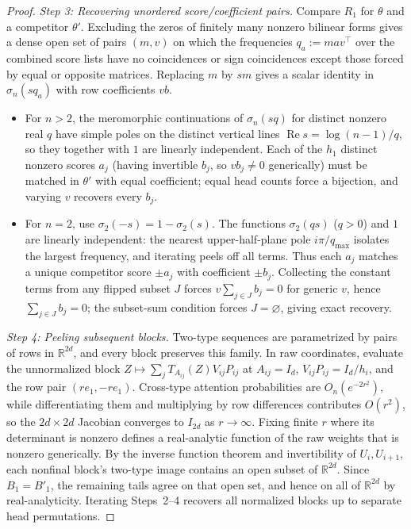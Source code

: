 \documentclass[11pt]{article}
\theoremstyle{plain}
\theoremstyle{definition}
\theoremstyle{remark}
\begin{document}
\begin{proof}
\emph{Step 3: Recovering unordered score/coefficient pairs.}
Compare $R_1$ for $\theta$ and a competitor $\theta'$. Excluding the zeros of finitely many nonzero bilinear forms gives a dense open set of pairs $(m, v)$ on which the frequencies $q_a := m a v^\top$ over the combined score lists have no coincidences or sign coincidences except those forced by equal or opposite matrices. Replacing $m$ by $sm$ gives a scalar identity in $\sigma_n(s q_a)$ with row coefficients $v b$.
\begin{itemize}[leftmargin=2em,itemsep=2pt]
\item For $n > 2$, the meromorphic continuations of $\sigma_n(sq)$ for distinct nonzero real $q$ have simple poles on the distinct vertical lines $\operatorname{Re} s = \log(n - 1)/q$, so they together with $1$ are linearly independent. Each of the $h_1$ distinct nonzero scores $a_j$ (having invertible $b_j$, so $v b_j \neq 0$ generically) must be matched in $\theta'$ with equal coefficient; equal head counts force a bijection, and varying $v$ recovers every $b_j$.
\item For $n = 2$, use $\sigma_2(-s) = 1 - \sigma_2(s)$. The functions $\sigma_2(qs)$ ($q > 0$) and $1$ are linearly independent: the nearest upper-half-plane pole $i\pi / q_{\max}$ isolates the largest frequency, and iterating peels off all terms. Thus each $a_j$ matches a unique competitor score $\pm a_j$ with coefficient $\pm b_j$. Collecting the constant terms from any flipped subset $J$ forces $v \sum_{j \in J} b_j = 0$ for generic $v$, hence $\sum_{j \in J} b_j = 0$; the subset-sum condition forces $J = \varnothing$, giving exact recovery.
\end{itemize}

\emph{Step 4: Peeling subsequent blocks.}
Two-type sequences are parametrized by pairs of rows in $\mathbb{R}^{2d}$, and every block preserves this family. In raw coordinates, evaluate the unnormalized block $Z \mapsto \sum_j T_{A_{ij}}(Z) V_{ij} P_{ij}$ at $A_{ij} = I_d$, $V_{ij} P_{ij} = I_d / h_i$, and the row pair $(r e_1, -r e_1)$. Cross-type attention probabilities are $O_n(e^{-2r^2})$, while differentiating them and multiplying by row differences contributes $O(r^2)$, so the $2d \times 2d$ Jacobian converges to $I_{2d}$ as $r \to \infty$. Fixing finite $r$ where its determinant is nonzero defines a real-analytic function of the raw weights that is nonzero generically. By the inverse function theorem and invertibility of $U_i, U_{i+1}$, each nonfinal block's two-type image contains an open subset of $\mathbb{R}^{2d}$. Since $B_1 = B'_1$, the remaining tails agree on that open set, and hence on all of $\mathbb{R}^{2d}$ by real-analyticity. Iterating Steps~2--4 recovers all normalized blocks up to separate head permutations.


\end{proof}
\end{document}

